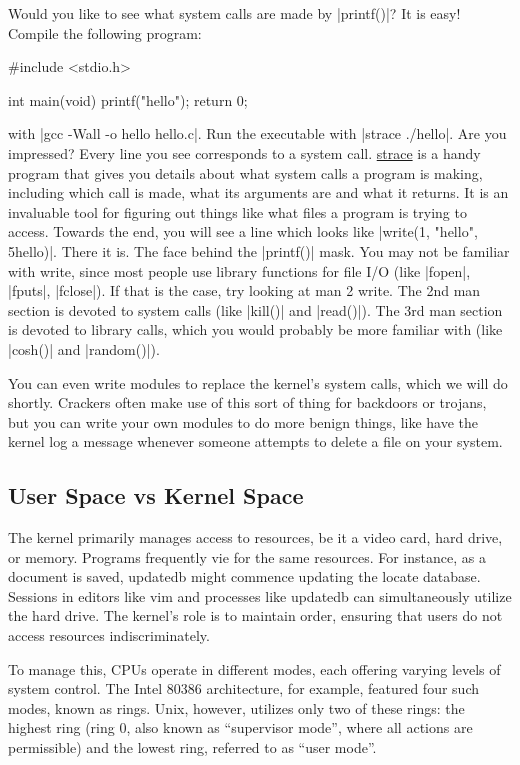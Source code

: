 \documentclass[10pt, oneside]{book}
\begin{document}
Would you like to see what system calls are made by \cpp|printf()|?
It is easy!
Compile the following program:

\begin{code}
#include <stdio.h>

int main(void)
{
    printf("hello");
    return 0;
}
\end{code}

with \sh|gcc -Wall -o hello hello.c|.
Run the executable with \sh|strace ./hello|.
Are you impressed?
Every line you see corresponds to a system call.
\href{https://strace.io/}{strace} is a handy program that gives you details about what system calls a program is making, including which call is made, what its arguments are and what it returns.
It is an invaluable tool for figuring out things like what files a program is trying to access.
Towards the end, you will see a line which looks like \cpp|write(1, "hello", 5hello)|.
There it is.
The face behind the \cpp|printf()| mask.
You may not be familiar with write, since most people use library functions for file I/O (like \cpp|fopen|, \cpp|fputs|, \cpp|fclose|).
If that is the case, try looking at man 2 write.
The 2nd man section is devoted to system calls (like \cpp|kill()| and \cpp|read()|).
The 3rd man section is devoted to library calls, which you would probably be more familiar with (like \cpp|cosh()| and \cpp|random()|).

You can even write modules to replace the kernel's system calls, which we will do shortly.
Crackers often make use of this sort of thing for backdoors or trojans, but you can write your own modules to do more benign things, like have the kernel log a message whenever someone attempts to delete a file on your system.

\subsection{User Space vs Kernel Space}
\label{sec:user_kernel_space}
The kernel primarily manages access to resources, be it a video card, hard drive, or memory.
Programs frequently vie for the same resources.
For instance, as a document is saved, updatedb might commence updating the locate database.
Sessions in editors like vim and processes like updatedb can simultaneously utilize the hard drive.
The kernel's role is to maintain order, ensuring that users do not access resources indiscriminately.

To manage this, CPUs operate in different modes, each offering varying levels of system control.
The Intel 80386 architecture, for example, featured four such modes, known as rings.
Unix, however, utilizes only two of these rings: the highest ring (ring 0, also known as ``supervisor mode'',
where all actions are permissible) and the lowest ring, referred to as ``user mode''.
\end{document}

